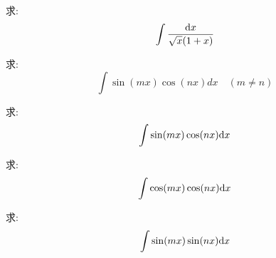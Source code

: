 \begin{example}
    求:
    \begin{equation}
        \int \frac{\mathrm{d} x}{\sqrt{x}(1+x)}
    \end{equation}
\end{example}
\begin{solution}
    
\end{solution}

\begin{example}
    求:
    \begin{equation}
        \int \sin(mx)\cos(nx) dx \quad (m \neq n)
    \end{equation}
\end{example}
\begin{solution}
    
\end{solution}

\begin{example}
    求:
    \begin{equation}
        \int \sin(mx) \cos(nx) \mathrm{d} x
    \end{equation}
\end{example}
\begin{solution}
    
\end{solution}

\begin{example}
    求:
    \begin{equation}
        \int \cos(mx) \cos(nx) \mathrm{d} x
    \end{equation}
\end{example}
\begin{solution}
    
\end{solution}

\begin{example}
    求:
    \begin{equation}
        \int \sin(mx) \sin(nx) \mathrm{d} x
    \end{equation}
\end{example}
\begin{solution}
    
\end{solution}